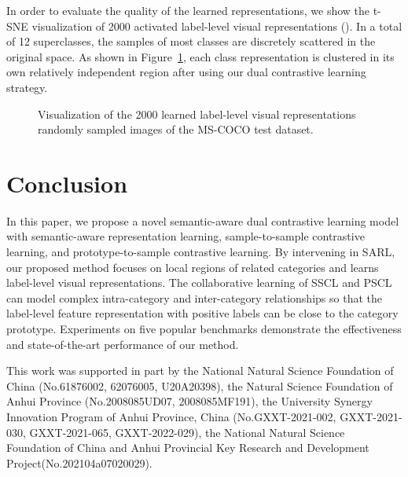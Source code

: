 \documentclass{ecai}
\begin{document}
In order to evaluate the quality of the learned representations, we show the t-SNE visualization of 2000 activated label-level visual representations (). In a total of 12 superclasses, the samples of most classes are discretely scattered in the original space. As shown in Figure~\ref{learned_features}, each class representation is clustered in its own relatively independent region after using our dual contrastive learning strategy.
\begin{figure}
\centering
	\subfigbottomskip=-5pt
	
	
	
	\caption{Visualization of the 2000 learned label-level visual representations randomly sampled images of the MS-COCO test dataset.}
\label{learned_features}
\end{figure}



\section{Conclusion}
In this paper, we propose a novel semantic-aware dual contrastive learning model with semantic-aware representation learning, sample-to-sample contrastive learning, and prototype-to-sample contrastive learning.
By intervening in SARL, our proposed method focuses on local regions of related categories and learns label-level visual representations.
The collaborative learning of SSCL and PSCL can model complex intra-category and inter-category relationships so that the label-level feature representation with positive labels can be close to the category prototype.
Experiments on five popular benchmarks demonstrate the effectiveness and state-of-the-art performance of our method.

\ack This work was supported in part by the National Natural Science Foundation of China (No.61876002, 62076005, U20A20398), 
the Natural Science Foundation of Anhui Province (No.2008085UD07, 2008085MF191), 
the University Synergy Innovation Program of Anhui Province, China (No.GXXT-2021-002, GXXT-2021-030, GXXT-2021-065, GXXT-2022-029), 
the National Natural Science Foundation of China and Anhui Provincial Key Research and Development Project(No.202104a07020029).






\end{document}
